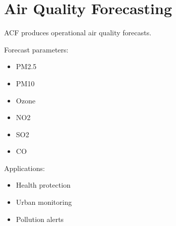 \section{Air Quality Forecasting}


ACF produces operational air quality forecasts.



Forecast parameters:


\begin{itemize}

\item PM2.5

\item PM10

\item Ozone

\item NO2

\item SO2

\item CO

\end{itemize}



Applications:


\begin{itemize}

\item Health protection

\item Urban monitoring

\item Pollution alerts

\end{itemize}
